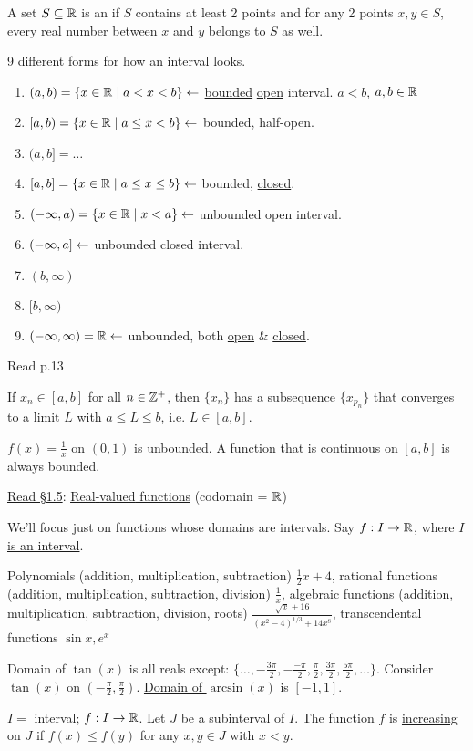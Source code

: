 \documentclass[]{article}
\begin{document}
\begin{definition}
	[p.13] A set $S\subseteq \mathbb{R}$ is an  if $S$ contains at least 2 points and for any 2 points $x,y\in S$, every real number between $x$ and $y$ belongs to $S$ as well.
\end{definition}
9 different forms for how an interval looks.
\begin{enumerate}
	\item $(a,b) = \{x\in\mathbb{R} \mid a<x<b \}\leftarrow$ \ul{bounded} \ul{open} interval. \ul{$a<b$}, $a,b\in\mathbb{R}$
	\item $[a,b) = \{ x\in\mathbb{R} \mid a\leq x <b \} \leftarrow$ bounded, half-open.
	\item $(a,b] = \dots$
	\item $[a,b] = \{ x\in\mathbb{R} \mid a\leq x \leq b\} \leftarrow$ bounded, \ul{closed}.
	\item $(-\infty,a) = \{x\in\mathbb{R}\mid x<a\} \leftarrow $ unbounded open interval.
	\item $(-\infty,a] \leftarrow $ unbounded closed interval.
	\item $(b,\infty)$
	\item $[b,\infty)$
	\item $(-\infty,\infty) = \mathbb{R} \leftarrow$ unbounded, both \ul{open} \& \ul{closed}.
\end{enumerate}
Read p.13
\begin{recall}
	 If $x_n\in[a,b]$ for all $n\in\mathbb{Z}^+$, then $\{x_n\}$ has a subsequence $\{x_{p_n}\}$ that converges to a limit $L$ with $a\leq L \leq b$, i.e. $L\in[a,b]$.
\end{recall}

\begin{example}
	$f(x) = \frac{1}{x}$ on $(0,1)$ is unbounded. A function that is continuous on $[a,b]$ is always bounded.
\end{example}
\ul{Read \S1.5}: \ul{\ul{Real}-\ul{valued} functions} (codomain = $\mathbb{R}$)

We'll focus just on functions whose domains are intervals. Say $f:I \rightarrow \mathbb{R}$, where \ul{$I$ is an interval}.

\begin{example}
	Polynomials (addition, multiplication, subtraction) $\frac{1}{2}x+4$, rational functions (addition, multiplication, subtraction, division) $\frac{1}{x}$, algebraic functions (addition, multiplication, subtraction, division, roots) 	$\frac{\sqrt{x}+16}{(x^2-4)^{1/3}+14x^8}$, transcendental functions $\sin{x},e^x$
\end{example}
\begin{example}
	Domain of $\tan{(x)}$ is all reals except: $\{\dots,-\frac{3\pi}{2},-\frac{-\pi}{2},\frac{\pi}{2},\frac{3\pi}{2},\frac{5\pi}{2},\dots\}$. Consider \ul{$\tan{(x)}$} on $(-\frac{\pi}{2},\frac{\pi}{2})$.
	\ul{Domain of $\arcsin{(x)}$} is $[-1,1]$.
\end{example}
\begin{definition}
	[p.40] $I = $ interval; $f:I\rightarrow \mathbb{R}$. Let $J$ be a subinterval of $I$. The function $f$ is \ul{increasing} on $J$ if $f(x)\leq f(y)$ for any $x,y \in J$ with $x<y$.
\end{definition}
\end{document}

